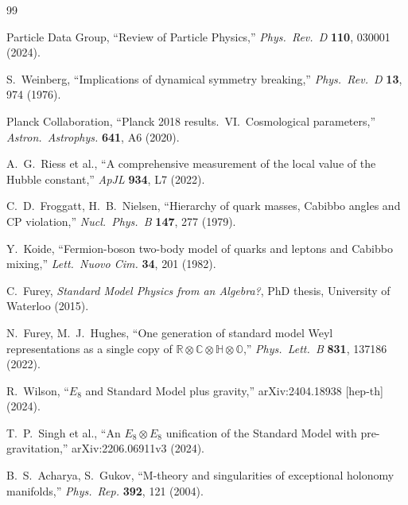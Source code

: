 
\begin{thebibliography}{99}

 Particle Data Group, ``Review of Particle Physics,'' \textit{Phys.\ Rev.\ D} \textbf{110}, 030001 (2024).

 S.~Weinberg, ``Implications of dynamical symmetry breaking,'' \textit{Phys.\ Rev.\ D} \textbf{13}, 974 (1976).

 Planck Collaboration, ``Planck 2018 results.\ VI.\ Cosmological parameters,'' \textit{Astron.\ Astrophys.} \textbf{641}, A6 (2020).

 A.~G.~Riess et al., ``A comprehensive measurement of the local value of the Hubble constant,'' \textit{ApJL} \textbf{934}, L7 (2022).

 C.~D.~Froggatt, H.~B.~Nielsen, ``Hierarchy of quark masses, Cabibbo angles and CP violation,'' \textit{Nucl.\ Phys.\ B} \textbf{147}, 277 (1979).

 Y.~Koide, ``Fermion-boson two-body model of quarks and leptons and Cabibbo mixing,'' \textit{Lett.\ Nuovo Cim.} \textbf{34}, 201 (1982).

 C.~Furey, \textit{Standard Model Physics from an Algebra?}, PhD thesis, University of Waterloo (2015).

 N.~Furey, M.~J.~Hughes, ``One generation of standard model Weyl representations as a single copy of $\mathbb{R} \otimes \mathbb{C} \otimes \mathbb{H} \otimes \mathbb{O}$,'' \textit{Phys.\ Lett.\ B} \textbf{831}, 137186 (2022).

 R.~Wilson, ``$E_8$ and Standard Model plus gravity,'' arXiv:2404.18938 [hep-th] (2024).

 T.~P.~Singh et al., ``An $E_8 \otimes E_8$ unification of the Standard Model with pre-gravitation,'' arXiv:2206.06911v3 (2024).

 B.~S.~Acharya, S.~Gukov, ``M-theory and singularities of exceptional holonomy manifolds,'' \textit{Phys.\ Rep.} \textbf{392}, 121 (2004).


\end{thebibliography}
